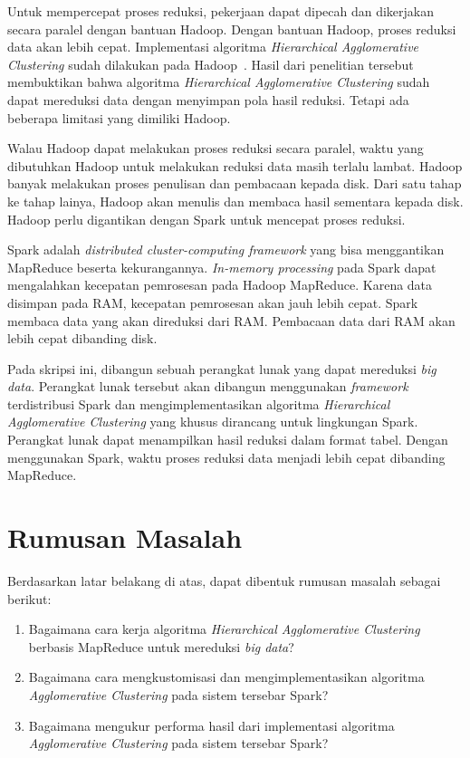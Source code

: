 Untuk mempercepat proses reduksi, pekerjaan dapat dipecah dan dikerjakan secara paralel dengan bantuan Hadoop. Dengan bantuan Hadoop, proses reduksi data akan lebih cepat. Implementasi algoritma {\it Hierarchical Agglomerative Clustering} sudah dilakukan pada Hadoop~\cite{veronica:02:bdhca}. Hasil dari penelitian tersebut membuktikan bahwa algoritma {\it Hierarchical Agglomerative Clustering} sudah dapat mereduksi data dengan menyimpan pola hasil reduksi. Tetapi ada beberapa limitasi yang dimiliki Hadoop. 

Walau Hadoop dapat melakukan proses reduksi secara paralel, waktu yang dibutuhkan Hadoop untuk melakukan reduksi data masih terlalu lambat. Hadoop banyak melakukan proses penulisan dan pembacaan kepada disk. Dari satu tahap ke tahap lainya, Hadoop akan menulis dan membaca hasil sementara kepada disk. Hadoop perlu digantikan dengan Spark untuk mencepat proses reduksi.

Spark adalah {\it distributed cluster-computing framework} yang bisa menggantikan MapReduce beserta kekurangannya. {\it In-memory processing} pada Spark dapat mengalahkan kecepatan pemrosesan pada Hadoop MapReduce. Karena data disimpan pada RAM, kecepatan pemrosesan akan jauh lebih cepat. Spark membaca data yang akan direduksi dari RAM. Pembacaan data dari RAM akan lebih cepat dibanding disk.

Pada skripsi ini, dibangun sebuah perangkat lunak yang dapat mereduksi {\it big data}. Perangkat lunak tersebut akan dibangun menggunakan \textit{framework} terdistribusi Spark dan mengimplementasikan algoritma {\it Hierarchical Agglomerative Clustering} yang khusus dirancang untuk lingkungan Spark. Perangkat lunak dapat menampilkan hasil reduksi dalam format tabel. Dengan menggunakan Spark, waktu proses reduksi data menjadi lebih cepat dibanding MapReduce.




\section{Rumusan Masalah}
\label{sec:rumusan}
Berdasarkan latar belakang di atas, dapat dibentuk rumusan masalah sebagai berikut:
\begin{enumerate}

\item Bagaimana cara kerja algoritma {\it Hierarchical Agglomerative Clustering} berbasis MapReduce untuk mereduksi {\it big data}?

\item Bagaimana cara mengkustomisasi dan mengimplementasikan algoritma {\it Agglomerative Clustering} pada sistem tersebar Spark?

\item Bagaimana mengukur performa hasil dari implementasi algoritma {\it Agglomerative Clustering} pada sistem tersebar Spark?

\end{enumerate}




